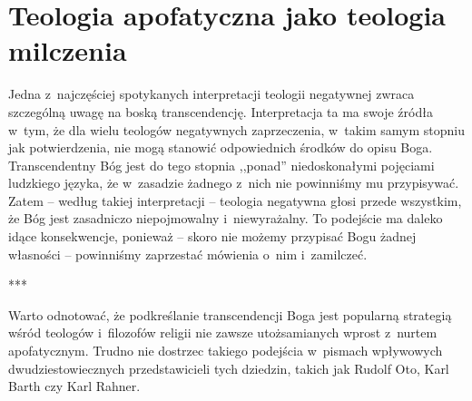 
\chapter{Teologia apofatyczna jako teologia milczenia}




Jedna z~najczęściej spotykanych interpretacji teologii negatywnej zwraca szczególną uwagę na boską transcendencję. Interpretacja ta ma swoje źródła w~tym, że dla wielu teologów negatywnych zaprzeczenia, w~takim samym stopniu jak potwierdzenia, nie mogą stanowić odpowiednich środków do opisu Boga. Transcendentny Bóg jest do tego stopnia ,,ponad'' niedoskonałymi pojęciami ludzkiego języka, że w~zasadzie żadnego z~nich nie powinniśmy mu przypisywać. Zatem -- według takiej interpretacji -- teologia negatywna głosi przede wszystkim, że Bóg jest zasadniczo niepojmowalny i~niewyrażalny. To podejście ma daleko idące konsekwencje, ponieważ -- skoro nie możemy przypisać Bogu żadnej własności -- powinniśmy zaprzestać mówienia o~nim i~zamilczeć.

***

Warto odnotować, że podkreślanie transcendencji Boga jest popularną strategią wśród teologów i~filozofów religii nie zawsze utożsamianych wprost z~nurtem apofatycznym. Trudno nie dostrzec takiego podejścia w~pismach wpływowych dwudziestowiecznych przedstawicieli tych dziedzin, takich jak Rudolf Oto, Karl Barth czy Karl Rahner.

